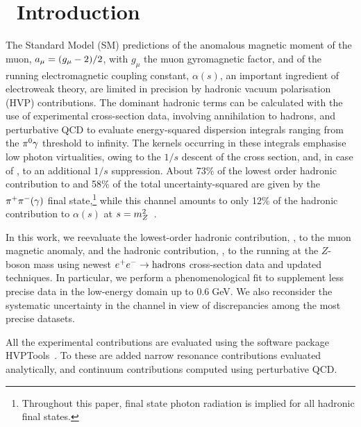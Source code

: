 \section{~Introduction}
\label{sec:Introduction}

The Standard Model (SM) predictions of the anomalous magnetic moment of the muon, 
$a_\mu=(g_\mu-2)/2$, with $g_\mu$ the muon gyromagnetic factor, 
and of the running electromagnetic coupling constant, $\alpha(s)$,  an important  ingredient 
of electroweak theory, are 
limited in precision by    hadronic vacuum polarisation (HVP) contributions. 
The dominant hadronic terms can be calculated with the use of experimental 
cross-section data, involving \ee annihilation to hadrons, and perturbative QCD to evaluate  energy-squared dispersion integrals ranging from the $\pi^0\gamma$ 
threshold to infinity. The  kernels occurring in these integrals 
emphasise low photon virtualities, owing to the $1/s$ descent of the cross section, 
and, in case of \amu, to an additional $1/s$ suppression. About 73\% 
of the lowest order hadronic contribution to \amu and 58\% of the total uncertainty-squared
are given by the $\pi^+\pi^-(\gamma)$ final state,\footnote
{Throughout this paper, final state photon radiation is implied for all 
   hadronic final states.
} 
while this channel amounts to only 12\% of the hadronic contribution to $\alpha(s)$ 
at $s=m_Z^2$~\cite{dhmz2017}.

In this work, we reevaluate the lowest-order hadronic contribution, \amuhadLO, to 
the muon magnetic anomaly, and the hadronic contribution, \dahadZ, to the running 
\aZ at the $Z$-boson mass using newest $e^+e^- \to {\rm hadrons}$ cross-section 
data and updated techniques. In particular, we perform a phenomenological fit to supplement less precise data in the low-energy domain up to 0.6$\;$GeV. We also reconsider the systematic uncertainty in the \pipi channel in view of discrepancies among the most precise datasets.


All the experimental contributions are evaluated using the software package
HVPTools~\cite{g209}. To these are added  narrow resonance contributions evaluated 
analytically, and continuum contributions computed using perturbative QCD. 
